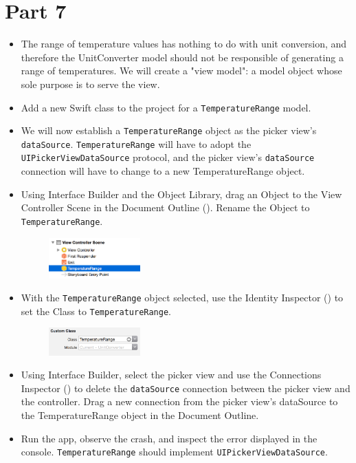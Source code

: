 \documentclass[a4paper,11pt]{scrartcl}
\begin{document}
\section*{Part 7}

\begin{itemize}
\item The range of temperature values has nothing to do with unit conversion, and therefore the UnitConverter model should not be responsible of generating a range of temperatures. We will create a "view model": a model object whose sole purpose is to serve the view.
\item Add a new Swift class to the project for a \texttt{TemperatureRange} model.
\item We will now establish a \texttt{TemperatureRange} object as the picker view's \texttt{dataSource}. \texttt{TemperatureRange} will have to adopt the \texttt{UIPickerViewDataSource} protocol, and the picker view's \texttt{dataSource} connection will have to change to a new TemperatureRange object.
\item Using Interface Builder and the Object Library, drag an Object to the View Controller Scene in the Document Outline (). Rename the Object to \texttt{TemperatureRange}.
\begin{figure}[h]
	\begin{center}
   \includegraphics[width=100pt]{temperaturerange.png}
	\end{center}
\end{figure}
\item With the \texttt{TemperatureRange} object selected, use the Identity Inspector () to set the Class to \texttt{TemperatureRange}.
\begin{figure}[h]
	\begin{center}
   \includegraphics[width=100pt]{identityinspector.png}
	\end{center}
\end{figure}
\item Using Interface Builder, select the picker view and use the Connections Inspector () to delete the \texttt{dataSource} connection between the picker view and the controller. Drag a new connection from the picker view's dataSource to the TemperatureRange object in the Document Outline.
\item Run the app, observe the crash, and inspect the error displayed in the console. \texttt{TemperatureRange} should implement \texttt{UIPickerViewDataSource}.
\end{itemize}
\end{document}
